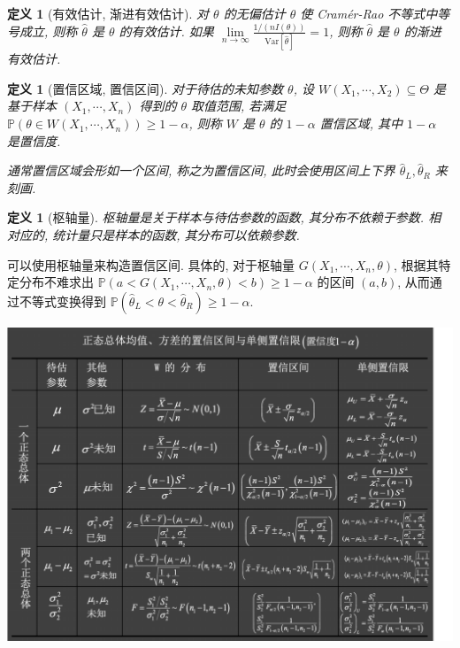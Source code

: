\documentclass[8pt]{article}
\theoremstyle{compact}
\newtheorem{definition}[theorem]{定义}
\def\ge{\geqslant}
\def\P#1{\mathbb{P}\left({#1}\right)}
\def\Var#1{\text{Var}\left[{#1}\right]}
\begin{document}
\begin{definition}[有效估计, 渐进有效估计]
	对 $\theta$ 的无偏估计 $\hat\theta$ 使 Cram\'er-Rao 不等式中等号成立, 则称 $\hat\theta$ 是 $\theta$ 的有效估计. 如果 $\lim\limits_{n \to \infty} \frac{1 / (nI(\theta))}{\Var{\hat\theta}} = 1$, 则称 $\hat\theta$ 是 $\theta$ 的渐进有效估计.
\end{definition}
\begin{definition}[置信区域, 置信区间]
	对于待估的未知参数 $\theta$, 设 $W(X_1, \cdots, X_2) \subseteq \Theta$ 是基于样本 $(X_1, \cdots, X_n)$ 得到的 $\theta$ 取值范围, 若满足 $\P{\theta \in W(X_1, \cdots, X_n)} \ge 1 - \alpha$, 则称 $W$ 是 $\theta$ 的 $1 - \alpha$ 置信区域, 其中 $1 - \alpha$ 是置信度.

	通常置信区域会形如一个区间, 称之为置信区间, 此时会使用区间上下界 $\hat{\theta}_L, \hat{\theta}_R$ 来刻画.
\end{definition}
\begin{definition}[枢轴量]
	枢轴量是关于样本与待估参数的函数, 其分布不依赖于参数. 相对应的, 统计量只是样本的函数, 其分布可以依赖参数.
\end{definition}
可以使用枢轴量来构造置信区间. 具体的, 对于枢轴量 $G(X_1, \cdots, X_n, \theta)$, 根据其特定分布不难求出 $\P{a < G(X_1, \cdots, X_n, \theta) < b} \ge 1 - \alpha$ 的区间 $(a, b)$, 从而通过不等式变换得到 $\P{\hat\theta_L < \theta < \hat\theta_R} \ge 1 - \alpha$.

\begin{center}
	\includegraphics*[scale=0.65]{estimator.png}
\end{center}
\end{document}
